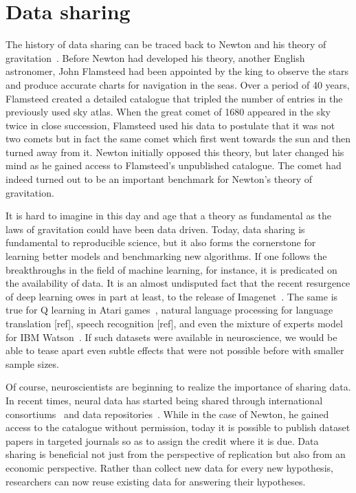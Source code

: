 \section{Data sharing}
The history of data sharing can be traced back to Newton and his theory of gravitation~\citep{pointofview2013}. Before Newton had developed his theory, another English astronomer, John Flamsteed had been appointed by the king to observe the stars and produce accurate charts for navigation in the seas. Over a period of 40 years, Flamsteed created a detailed catalogue that tripled the number of entries in the previously used sky atlas. When the great comet of 1680 appeared in the sky twice in close succession, Flamsteed used his data to postulate that it was not two comets but in fact the same comet which first went towards the sun and then turned away from it. Newton initially opposed this theory, but later changed his mind as he gained access to Flamsteed's unpublished catalogue. The comet had indeed turned out to be an important benchmark for Newton's theory of gravitation.

It is hard to imagine in this day and age that a theory as fundamental as the laws of gravitation could have been data driven. Today, data sharing is fundamental to reproducible science, but it also forms the cornerstone for learning better models and benchmarking new algorithms. If one follows the breakthroughs in the field of machine learning, for instance, it is predicated on the availability of data. It is an almost undisputed fact that the recent resurgence of deep learning owes in part at least, to the release of Imagenet~\citep{deng2009imagenet}. The same is true for Q learning in Atari games~\citep{watkins1992q, bellemare2013arcade}, natural language processing for language translation [ref], speech recognition [ref], and even the mixture of experts model~\citep{jacobs1991adaptive} for IBM Watson~\citep{ferrucci2010building}. If such datasets were available in neuroscience, we would be able to tease apart even subtle effects that were not possible before with smaller sample sizes.

Of course, neuroscientists are beginning to realize the importance of sharing data. In recent times, neural data has started being shared through international consortiums~\citep{van2013wu, ollier2005uk} and data repositories~\citep{poldrack2013toward, gorgolewski2015neurovault}. While in the case of Newton, he gained access to the catalogue without permission, today it is possible to publish dataset papers in targeted journals so as to assign the credit where it is due.
Data sharing is beneficial not just from the perspective of replication but also from an economic perspective. Rather than collect new data for every new hypothesis, researchers can now reuse existing data for answering their hypotheses.

